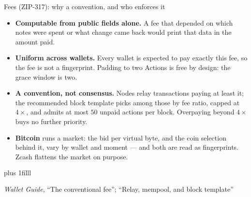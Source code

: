 \documentclass[aspectratio=169,11pt]{beamer}
\newcommand{\src}[1]{\par\vskip0pt plus 1filll
  {\fontsize{6}{7.2}\selectfont\color{arbdim}\raggedright #1\par}}
\begin{document}
\begin{frame}{Fees (ZIP-317): why a convention, and who enforces it}
\small
\begin{itemize}
  \item \textbf{Computable from public fields alone.} A fee that
    depended on which notes were spent or what change came back would
    print that data in the amount paid.
  \item \textbf{Uniform across wallets.} Every wallet is expected to pay
    exactly this fee, so the fee is not a fingerprint. Padding to two
    Actions is free by design: the grace window is two.
  \item \textbf{A convention, not consensus.} Nodes relay transactions
    paying at least it; the recommended block template picks among
    those by fee ratio, capped at $4\times$, and admits at most $50$
    unpaid actions per block. Overpaying beyond $4\times$ buys no
    further priority.
  \item \textbf{Bitcoin} runs a market: the bid per virtual byte, and
    the coin selection behind it, vary by wallet and moment --- and both
    are read as fingerprints. Zcash flattens the market on purpose.
\end{itemize}
\src{\emph{Wallet Guide}, ``The conventional fee''; ``Relay, mempool,
  and block template''}
\end{frame}
\end{document}
